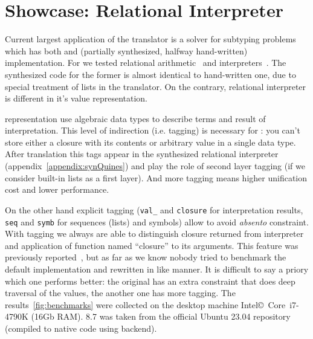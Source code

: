 
\section{Showcase: Relational Interpreter}
\label{sec:interpreter}

Current largest application of the translator is a solver for \Java{} subtyping problems~\cite{JavaGenericsSolver2023} which has both \OCaml{} and (partially synthesized, halfway hand-written) \Kotlin{} implementation.
For \Scheme{} we tested relational arithmetic~\cite{Kiselyov2008PureDA} and interpreters~\cite{Untagged}.
The synthesized code for the former is almost identical to hand-written one, due to special treatment of lists in the translator.
On the contrary, relational interpreter is different in it's value representation.

\OCanren{} representation use algebraic data types to describe terms and result of interpretation.
This level of indirection (i.e. tagging) is necessary for \OCaml{}: you can't store either a closure with its contents or arbitrary value in a single data type.
After translation this tags appear in the synthesized relational interpreter (appendix~\ref{appendix:synQuines}) and play the role of second layer tagging (if we consider built-in \Scheme{} lists as a first layer).
And more tagging means higher unification cost and lower performance.

On the other hand explicit tagging (\texttt{val\_} and \verb=closure= for interpretation results, \verb=seq= and \verb=symb= for sequences (lists) and symbols) allow to avoid \emph{absento} constraint.
With tagging we always are able to distinguish closure returned from interpreter and application of function named ``closure'' to its arguments.
This feature was previously reported~\cite{OCanren}, but as far as we know nobody tried to benchmark the default \Scheme{} implementation and rewritten in \OCanren{} like manner.
It is difficult to say a priory which one performs better: the original has an extra constraint that does deep traversal of the values, the another one has more tagging.
The results~\ref{fig:benchmarks} were collected  on the desktop machine Intel\copyright~Core\texttrademark~i7-4790K (16Gb RAM).
\Racket{} 8.7 was taken from the official Ubuntu 23.04 repository (compiled to native code using \Chez{} backend).


